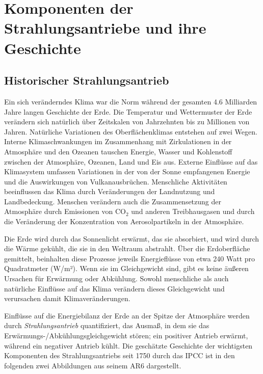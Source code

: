 \documentclass[12pt,paper=a4,DIV=12,parskip=never,chapterprefix=false,headings=standardclasses]{scrreprt}
\numberwithin{figure}{chapter}
\begin{document}
\section{Komponenten der Strahlungsantriebe und ihre Geschichte}
\subsection{Historischer Strahlungsantrieb}
Ein sich veränderndes Klima war die Norm während der gesamten 4.6 Milliarden Jahre langen Geschichte der Erde. Die Temperatur und Wettermuster der Erde verändern sich natürlich über Zeitskalen von Jahrzehnten bis zu Millionen von Jahren. Natürliche Variationen des Oberflächenklimas entstehen auf zwei Wegen. Interne Klimaschwankungen im Zusammenhang mit Zirkulationen in der Atmosphäre und den Ozeanen tauschen Energie, Wasser und Kohlenstoff zwischen der Atmosphäre, Ozeanen, Land und Eis aus. Externe Einflüsse auf das Klimasystem umfassen Variationen in der von der Sonne empfangenen Energie und die Auswirkungen von Vulkanausbrüchen. Menschliche Aktivitäten beeinflussen das Klima durch Veränderungen der Landnutzung und Landbedeckung. Menschen verändern auch die Zusammensetzung der Atmosphäre durch Emissionen von CO$_2$ und anderen Treibhausgasen und durch die Veränderung der Konzentration von Aerosolpartikeln in der Atmosphäre.

Die Erde wird durch das Sonnenlicht erwärmt, das sie absorbiert, und wird durch die Wärme gekühlt, die sie in den Weltraum abstrahlt. Über die Erdoberfläche gemittelt, beinhalten diese Prozesse jeweils Energieflüsse von etwa 240 Watt pro Quadratmeter (W/m²). Wenn sie im Gleichgewicht sind, gibt es keine äußeren Ursachen für Erwärmung oder Abkühlung. Sowohl menschliche als auch natürliche Einflüsse auf das Klima verändern dieses Gleichgewicht und verursachen damit Klimaveränderungen.

Einflüsse auf die Energiebilanz der Erde an der Spitze der Atmosphäre werden durch \emph{Strahlungsantrieb} quantifiziert, das Ausmaß, in dem sie das Erwärmungs-/Abkühlungsgleichgewicht stören; ein positiver Antrieb erwärmt, während ein negativer Antrieb kühlt. Die geschätzte Geschichte der wichtigsten Komponenten des Strahlungsantriebs seit 1750 durch das IPCC ist in den folgenden zwei Abbildungen aus seinem AR6 dargestellt.
\end{document}
